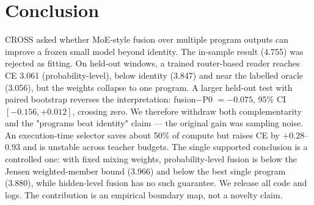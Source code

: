 \documentclass[11pt,a4paper]{article}
\begin{document}
\section{Conclusion}
CROSS asked whether MoE-style fusion over multiple program outputs can improve a
frozen small model beyond identity. The in-sample result (4.755) was rejected as
fitting. On held-out windows, a trained router-based reader reaches CE 3.061
(probability-level), below identity (3.847) and near the labelled oracle (3.056),
but the weights collapse to one program. A larger held-out test with paired
bootstrap reverses the interpretation: fusion$-$P0 $= -0.075$, 95\% CI
$[-0.156,+0.012]$, crossing zero. We therefore withdraw both complementarity and
the "programs beat identity" claim --- the original gain was sampling noise. An
execution-time selector saves about 50\% of compute but raises CE by $+0.28$--$0.93$
and is unstable across teacher budgets. The single supported conclusion is a
controlled one: with fixed mixing weights, probability-level fusion is below the
Jensen weighted-member bound (3.966) and below the best single program (3.880),
while hidden-level fusion has no such guarantee. We release all code and logs.
The contribution is an empirical boundary map, not a novelty claim.
\end{document}
